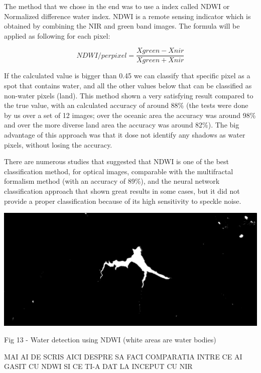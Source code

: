 \documentclass[12pt, a4paper]{report}
\begin{document}
The method that we chose in the end was to use a index called NDWI or Normalized difference water index. NDWI is a remote sensing indicator which is obtained by combining the NIR and green band images. The formula will be applied as following for each pixel:

$$ NDWI/perpixel = \frac{Xgreen - Xnir}{Xgreen + Xnir}$$

If the calculated value is bigger than 0.45 we can classify that specific pixel as a spot that contains water, and all the other values below that can be classified as non-water pixels (land). This method shown a very satisfying result compared to the true value, with an calculated accuracy of around 88\% (the tests were done by us over a set of 12 images; over the oceanic area the accuracy was around 98\% and over the more diverse land area the accuracy was around 82\%). The big advantage of this approach was that it dose not identify any shadows as water pixels, without losing the accuracy. 
\par 
There are numerous studies \cite{NDWI, NDWI Comparison} that suggested that NDWI is one of the best classification method, for optical images, comparable with the multifractal formalism method (with an accuracy of 89\%), and the neural network classification approach that shown great results in some cases, but it did not provide a proper classification because of its high sensitivity to speckle noise.

\includegraphics[scale=0.35, left]{NDWI-prediction.png}
\begin{center}
Fig 13 - Water detection using NDWI (white areas are water bodies)
\end{center}


\par 

\bigskip


MAI AI DE SCRIS AICI DESPRE SA FACI COMPARATIA INTRE CE AI GASIT CU NDWI SI CE TI-A DAT LA INCEPUT CU NIR
\end{document}
